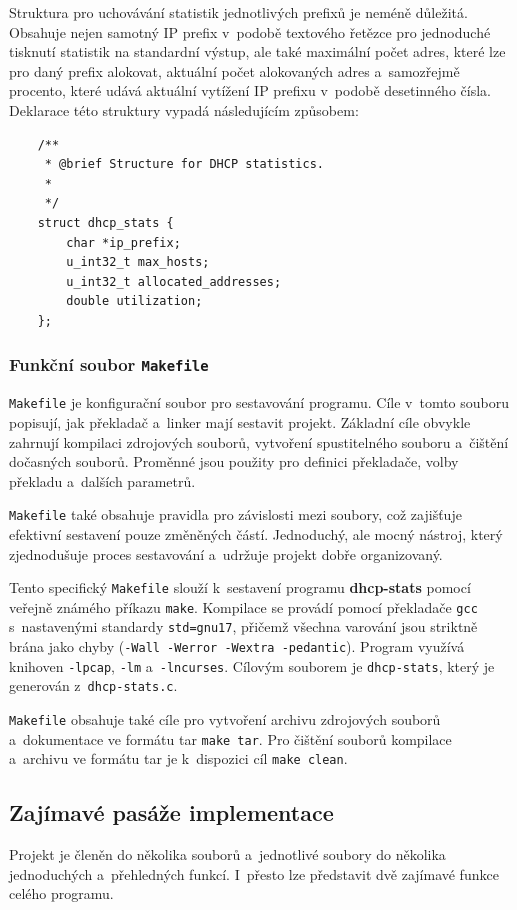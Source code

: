 \documentclass[a4paper, 11pt]{article}
\begin{document}
Struktura pro uchovávání statistik jednotlivých prefixů je neméně důležitá.
Obsahuje nejen samotný IP prefix v~podobě textového řetězce pro jednoduché tisknutí statistik na standardní výstup, ale také maximální počet adres, které lze pro daný prefix alokovat, aktuální počet alokovaných adres a~samozřejmě procento, které udává aktuální vytížení IP prefixu v~podobě desetinného čísla.
Deklarace této struktury vypadá následujícím způsobem:

\begin{verbatim}
    /**
     * @brief Structure for DHCP statistics.
     * 
     */
    struct dhcp_stats {
        char *ip_prefix;
        u_int32_t max_hosts;
        u_int32_t allocated_addresses;
        double utilization;
    };
\end{verbatim}

\subsubsection{Funkční soubor \texttt{Makefile}}
\texttt{Makefile} je konfigurační soubor pro sestavování programu.
Cíle v~tomto souboru popisují, jak překladač a~linker mají sestavit projekt.
Základní cíle obvykle zahrnují kompilaci zdrojových souborů, vytvoření spustitelného souboru a~čištění dočasných souborů.
Proměnné jsou použity pro definici překladače, volby překladu a~dalších parametrů.

\texttt{Makefile} také obsahuje pravidla pro závislosti mezi soubory, což zajišťuje efektivní sestavení pouze změněných částí.
Jednoduchý, ale mocný nástroj, který zjednodušuje proces sestavování a~udržuje projekt dobře organizovaný.

Tento specifický \texttt{Makefile} slouží k~sestavení programu \textbf{dhcp-stats} pomocí veřejně známého příkazu \texttt{make}.
Kompilace se provádí pomocí překladače \texttt{gcc} \cite{gcc} s~nastavenými standardy \texttt{std=gnu17}, přičemž všechna varování jsou striktně brána jako chyby (\texttt{-Wall -Werror -Wextra -pedantic}).
Program využívá knihoven \texttt{-lpcap}, \texttt{-lm} a~\texttt{-lncurses}.
Cílovým souborem je \texttt{dhcp-stats}, který je generován z~\texttt{dhcp-stats.c}.

\texttt{Makefile} obsahuje také cíle pro vytvoření archivu zdrojových souborů a~dokumentace ve formátu tar \texttt{make tar}.
Pro čištění souborů kompilace a~archivu ve formátu tar je k~dispozici cíl \texttt{make clean}.

\subsection{Zajímavé pasáže implementace}
Projekt je členěn do několika souborů a~jednotlivé soubory do několika jednoduchých a~přehledných funkcí.
I~přesto lze představit dvě zajímavé funkce celého programu.
\end{document}
